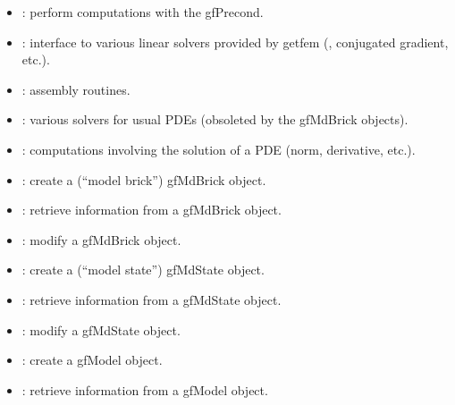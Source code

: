 \documentclass[a4paper,11pt,english]{sphinxmanual}
\begin{document}
\begin{itemize}
\item {} 
\sphinxAtStartPar
{} : perform computations with the gfPrecond.

\item {} 
\sphinxAtStartPar
{} : interface to various linear solvers provided by getfem
(, conjugated gradient, etc.).

\item {} 
\sphinxAtStartPar
{} : assembly routines.

\item {} 
\sphinxAtStartPar
{} : various solvers for usual PDEs (obsoleted by the gfMdBrick
objects).

\item {} 
\sphinxAtStartPar
{} : computations involving the solution of a PDE (norm,
derivative, etc.).

\item {} 
\sphinxAtStartPar
{} : create a (“model brick”) gfMdBrick object.

\item {} 
\sphinxAtStartPar
{} : retrieve information from a gfMdBrick object.

\item {} 
\sphinxAtStartPar
{} : modify a gfMdBrick object.

\item {} 
\sphinxAtStartPar
{} : create a (“model state”) gfMdState object.

\item {} 
\sphinxAtStartPar
{} : retrieve information from a gfMdState object.

\item {} 
\sphinxAtStartPar
{} : modify a gfMdState object.

\item {} 
\sphinxAtStartPar
{} : create a gfModel object.

\item {} 
\sphinxAtStartPar
{} : retrieve information from a gfModel object.


\end{itemize}
\end{document}
